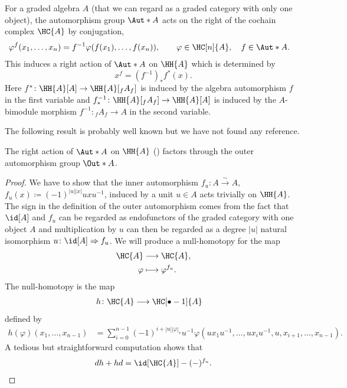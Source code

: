 \documentclass[a4paper]{amsart}
\begin{document}
\begin{remark}\label{rmk:automorphism_action_on_cochains}
For a graded algebra $A$ (that we can regard as a graded category with only one object), the automorphism group $\Aut*{A}$ acts on the right of the cochain complex $\HC{A}$ by conjugation,
\begin{align*}
	\varphi^{f}(x_1,\dots,x_n)&=f^{-1}\varphi(f(x_1),\dots,f(x_n)),
	\qquad \varphi\in\HC[n]{A},\quad f\in\Aut*{A}.
\end{align*}
This induces a right action of $\Aut*{A}$ on $\HH{A}$ which is determined by \[x^f=(f^{-1})_*f^*(x).\]
Here $f^*\colon \HH{A}[A]\to \HH{A}[{}_fA_f]$ is induced by the algebra automorphism $f$ in the first variable and $f^{-1}_*\colon \HH{A}[{}_fA_f]\to \HH{A}[A]$ is induced by the $A$-bimodule morphism $f^{-1}\colon {}_fA_f\to A$ in the second variable.
\end{remark}

The following result is probably well known but we have not found any reference.

\begin{proposition}
\label{prop:inner_auto}
	The right action of $\Aut*{A}$ on $\HH{A}$ () factors through the outer automorphism 	group $\Out*{A}$.
\end{proposition}

\begin{proof}
	We have to show that the inner automorphism $f_u\colon A\stackrel{\sim}{\to} A$, $f_u(x)\coloneqq (-1)^{|u||x|}uxu^{-1}$, induced by a unit $u\in A$ acts trivially on $\HH{A}$. The sign in the definition of the outer automorphism comes from the fact that $\id[A]$ and $f_u$ can be regarded as endofunctors of the graded category with one object $A$ and multiplication by $u$ can then be regarded as a degree $|u|$ natural isomorphism $u\colon\id[A]\Rightarrow f_u$. We will produce a null-homotopy for the map
	\begin{align*}
		\HC{A}&\longrightarrow\HC{A},\\
		\varphi&\longmapsto\varphi^{f_u}.
	\end{align*}
	The null-homotopy is the map 
	\begin{align*}
		h\colon\HC{A}&\longrightarrow\HC[\bullet-1]{A}
	\end{align*}
	defined by 
	\begin{align*}
		h(\varphi)(x_1,\dots,x_{n-1})&=\sum_{i=0}^{n-1}(-1)^{i+|u||\varphi|_v}u^{-1}\varphi(ux_1u^{-1},\dots, ux_iu^{-1},u,x_{i+1},\dots,x_{n-1}).
	\end{align*}
	A tedious but straightforward computation shows that
	\[dh+hd=\id[\HC{A}]-(-)^{f_u}.\qedhere\]
\end{proof}
\end{document}
